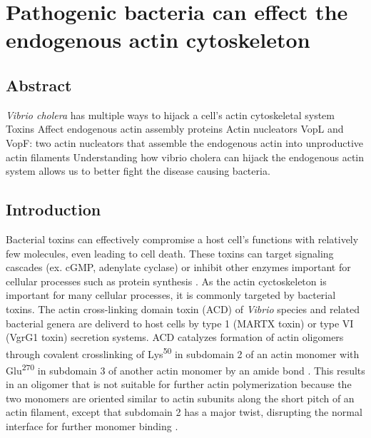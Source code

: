 \chapter{Pathogenic bacteria can effect the endogenous actin cytoskeleton}\label{ch:vibrio}

\section[Abstract]{Abstract\footnotemark}
\textit{Vibrio cholera} has multiple ways to hijack a cell’s actin cytoskeletal system
Toxins
Affect endogenous actin assembly proteins
Actin nucleators
VopL and VopF: two actin nucleators that assemble the endogenous actin into unproductive actin filaments
Understanding how vibrio cholera can hijack the endogenous actin system allows us to better fight the disease causing bacteria.


\section{Introduction}\label{ch04-introduction}
Bacterial toxins can effectively compromise a host cell's functions with relatively few molecules, even leading to cell death. These toxins can target signaling cascades (ex. cGMP, adenylate cyclase) or inhibit other enzymes important for cellular processes such as protein synthesis \citep{henkel_toxins_2010}. As the actin cyctoskeleton is important for many cellular processes, it is commonly targeted by bacterial toxins. The actin cross-linking domain toxin (ACD) of \textit{Vibrio} species and related bacterial genera are deliverd to host cells by type 1 (MARTX toxin) or type VI (VgrG1 toxin) secretion systems. ACD catalyzes formation of actin oligomers through covalent crosslinking of Lys\textsuperscript{50} in subdomain 2 of an actin monomer with Glu\textsuperscript{270} in subdomain 3 of another actin monomer by an amide bond \citep{kudryashov_connecting_2008,kudryashova_glutamyl_2012}. This results in an oligomer that is not suitable for further actin polymerization because the two monomers are oriented similar to actin subunits along the short pitch of an actin filament, except that subdomain 2 has a major twist, disrupting the normal interface for further monomer binding \citep{kudryashov_connecting_2008}.  

